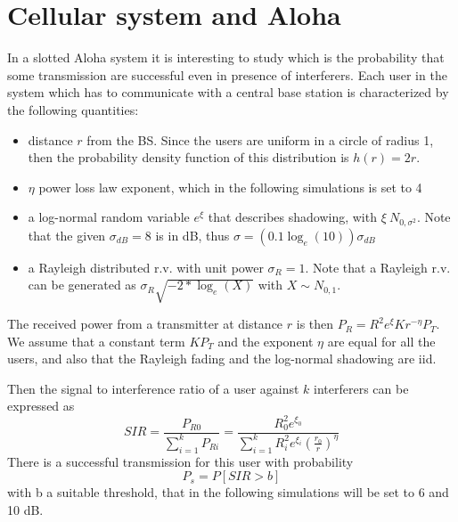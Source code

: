 \documentclass[10pt]{article}
\begin{document}
\section*{Cellular system and Aloha}
In a slotted Aloha system it is interesting to study which is the probability that some transmission are successful even in presence of interferers. 
Each user in the system which has to communicate with a central base station is characterized by the following quantities:
\begin{itemize}
\item distance $r$ from the BS. Since the users are uniform in a circle of radius 1, then the probability density function of this distribution is $h(r) = 2r$.
\item $\eta$ power loss law exponent, which in the following simulations is set to 4
\item a log-normal random variable $e^{\xi}$ that describes shadowing, with $\xi ~ N_{0,\sigma^2}$. Note that the given $\sigma_{dB}= 8$ is in dB, thus $\sigma = (0.1 \log_e(10))\sigma_{dB}$
\item a Rayleigh distributed r.v. with unit power $\sigma_R = 1$. Note that a Rayleigh r.v. can be generated as $\sigma_R \sqrt{-2*\log_e(X)}$ with $X \sim N_{0,1}$.
\end{itemize}
The received power from a transmitter at distance $r$ is then $P_R = R^2 e^{\xi} K r^{-\eta} P_T$. We assume that a constant term $K P_T$ and the exponent $\eta$ are equal for all the users, and also that the Rayleigh fading and the log-normal shadowing are iid. 

Then the signal to interference ratio of a user against $k$ interferers can be expressed as
\begin{equation}
  SIR = \frac{P_{R0}}{\sum_{i=1}^{k} P_{Ri}} = \frac{R_0^2 e^{\xi_0}}{\sum_{i = 1}^{k}R_i^2 e^{\xi_i}\left(\frac{r_0}{r}\right)^{\eta}}
\end{equation}
There is a successful transmission for this user with probability 
\begin{equation}
  P_s = P[SIR > b]
\end{equation}
with b a suitable threshold, that in the following simulations will be set to 6 and 10 dB. 
\end{document}
